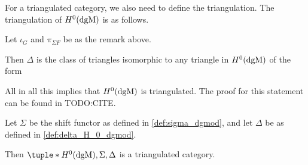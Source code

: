 For a triangulated category, we also need to define the triangulation. The triangulation of \( H^0(\operatorname{dgM}) \) is as follows.
\begin{definition}
    \label{def:delta_H_0_dgmod}
    Let \( \iota_G \) and \( \pi_{\Sigma F} \) be as the remark above.

    Then \( \Delta \) is the class of triangles isomorphic to any triangle in \( H^0(\operatorname{dgM}) \) of the form
    \begin{center}
    \end{center}
\end{definition}

All in all this implies that \( H^0(\operatorname{dgM}) \) is triangulated. The proof for this statement can be found in TODO:CITE.
\begin{theorem}
    Let \( \Sigma \) be the shift functor as defined in \autoref{def:sigma_dgmod}, and let \( \Delta \) be as defined in \autoref{def:delta_H_0_dgmod}.

    Then \( \tuple*{H^0(\dgM), \Sigma, \Delta} \) is a triangulated category.
\end{theorem}





    

